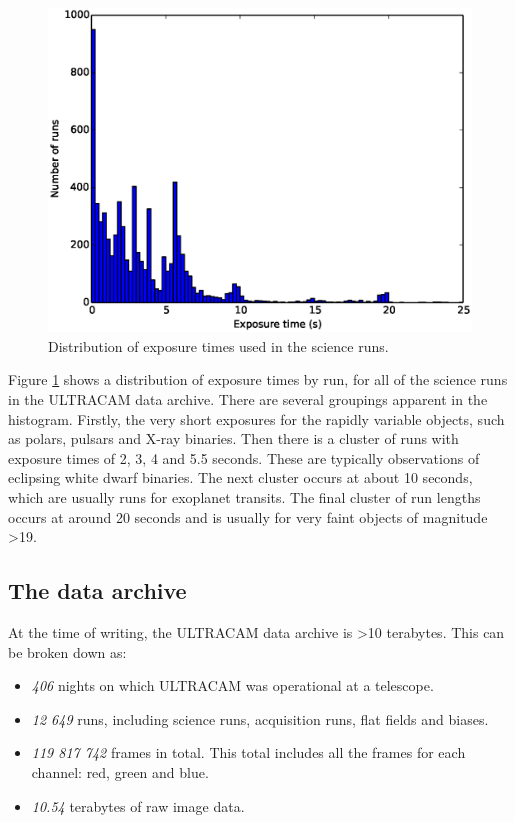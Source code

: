 \begin{figure}
  \centering
  \includegraphics[width=120mm]{images/cadences_hist0-25.eps}
  \caption{Distribution of exposure times used in the science runs.}
  \label{fig:cadences}
\end{figure}

Figure \ref{fig:cadences} shows a distribution of exposure times by run, for all of the science runs in the ULTRACAM data archive. There are several groupings apparent in the histogram. Firstly, the very short exposures for the rapidly variable objects, such as polars, pulsars and X-ray binaries. Then there is a cluster of runs with exposure times of 2, 3, 4 and 5.5 seconds. These are typically observations of eclipsing white dwarf binaries. The next cluster occurs at about 10 seconds, which are usually runs for exoplanet transits. The final cluster of run lengths occurs at around 20 seconds and is usually for very faint objects of magnitude \textgreater 19.

\subsection{The data archive}
At the time of writing, the ULTRACAM data archive is \textgreater 10 terabytes. This can be broken down as:
\begin{itemize}
	\item \emph{406} nights on which ULTRACAM was operational at a telescope.
	\item \emph{12 649} runs, including science runs, acquisition runs, flat fields and biases. 
	\item \emph{119 817 742} frames in total. This total includes all the frames for each channel: red, green and blue.
	\item \emph{10.54} terabytes of raw image data.
\end{itemize} 

